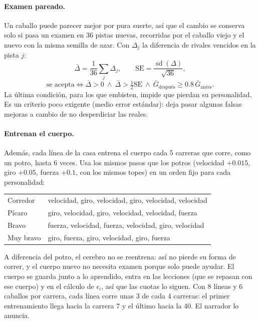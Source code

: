 \documentclass[11pt,letterpaper]{article}
\begin{document}
\paragraph{Examen pareado.} Un caballo puede parecer mejor por pura suerte, así que el cambio se conserva solo si pasa un examen en 36 pistas nuevas, recorridas por el caballo viejo y el nuevo con la misma semilla de azar. Con $\Delta_j$ la diferencia de rivales vencidos en la pista $j$:
\begin{equation}
\bar\Delta = \frac{1}{36}\sum_{j}\Delta_j, \qquad \mathrm{SE} = \frac{\operatorname{sd}(\Delta)}{\sqrt{36}},
\end{equation}
\begin{equation}
\text{se acepta} \iff \bar\Delta > 0 \ \wedge\ \bar\Delta > \tfrac{1}{2}\mathrm{SE} \ \wedge\ \bar G_{\text{después}} \ge 0.8\, \bar G_{\text{antes}}.
\end{equation}
La última condición, para los que embisten, impide que pierdan su personalidad. Es un criterio poco exigente (medio error estándar): deja pasar algunas falsas mejoras a cambio de no desperdiciar las reales.

\paragraph{Entrenan el cuerpo.} Además, cada línea de la casa entrena el cuerpo cada 5 carreras que corre, como un potro, hasta 6 veces. Usa los mismos pasos que los potros (velocidad $+0.015$, giro $+0.05$, fuerza $+0.1$, con los mismos topes) en un orden fijo para cada personalidad:
\begin{center}\footnotesize
\begin{tabular}{ll}
\toprule
Corredor & velocidad, giro, velocidad, giro, velocidad, velocidad \\
Pícaro & giro, velocidad, giro, velocidad, velocidad, fuerza \\
Bravo & fuerza, velocidad, fuerza, velocidad, giro, velocidad \\
Muy bravo & giro, fuerza, giro, velocidad, giro, fuerza \\
\bottomrule
\end{tabular}
\end{center}
A diferencia del potro, el cerebro no se reentrena: así no pierde su forma de correr, y el cuerpo nuevo no necesita examen porque solo puede ayudar. El cuerpo se guarda junto a lo aprendido, entra en las lecciones (que se repasan con ese cuerpo) y en el cálculo de $\epsilon_i$, así que las cuotas lo siguen. Con 8 líneas y 6 caballos por carrera, cada línea corre unas 3 de cada 4 carreras: el primer entrenamiento llega hacia la carrera 7 y el último hacia la 40. El narrador lo anuncia.
\end{document}
